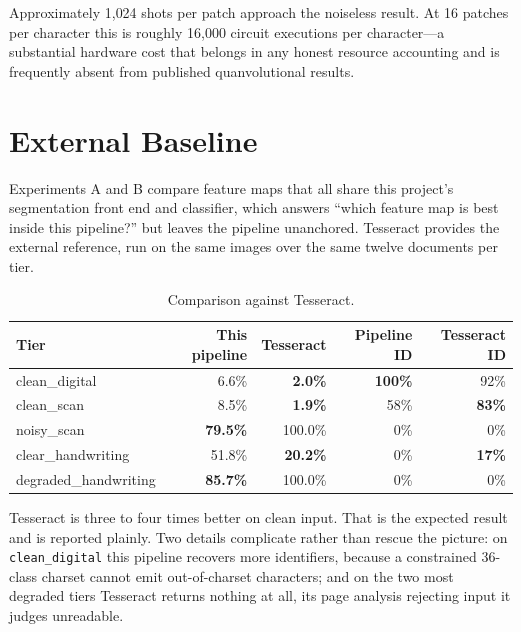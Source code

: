\documentclass[11pt,a4paper]{article}
\begin{document}
Approximately 1{,}024 shots per patch approach the noiseless result. At 16
patches per character this is roughly 16{,}000 circuit executions per
character---a substantial hardware cost that belongs in any honest resource
accounting and is frequently absent from published quanvolutional results.

\section{External Baseline}

Experiments A and B compare feature maps that all share this project's
segmentation front end and classifier, which answers ``which feature map is best
inside this pipeline?'' but leaves the pipeline unanchored. Tesseract provides
the external reference, run on the same images over the same twelve documents per
tier.

\begin{table}[h]
\centering
\caption{Comparison against Tesseract.}
\begin{tabular}{@{}lrrrr@{}}
\toprule
Tier & This pipeline & Tesseract & Pipeline ID & Tesseract ID \\
\midrule
clean\_digital & 6.6\% & \textbf{2.0\%} & \textbf{100\%} & 92\% \\
clean\_scan & 8.5\% & \textbf{1.9\%} & 58\% & \textbf{83\%} \\
noisy\_scan & \textbf{79.5\%} & 100.0\% & 0\% & 0\% \\
clear\_handwriting & 51.8\% & \textbf{20.2\%} & 0\% & \textbf{17\%} \\
degraded\_handwriting & \textbf{85.7\%} & 100.0\% & 0\% & 0\% \\
\bottomrule
\end{tabular}
\end{table}

Tesseract is three to four times better on clean input. That is the expected
result and is reported plainly. Two details complicate rather than rescue the
picture: on \texttt{clean\_digital} this pipeline recovers more identifiers,
because a constrained 36-class charset cannot emit out-of-charset characters; and
on the two most degraded tiers Tesseract returns nothing at all, its page
analysis rejecting input it judges unreadable.

\end{document}
